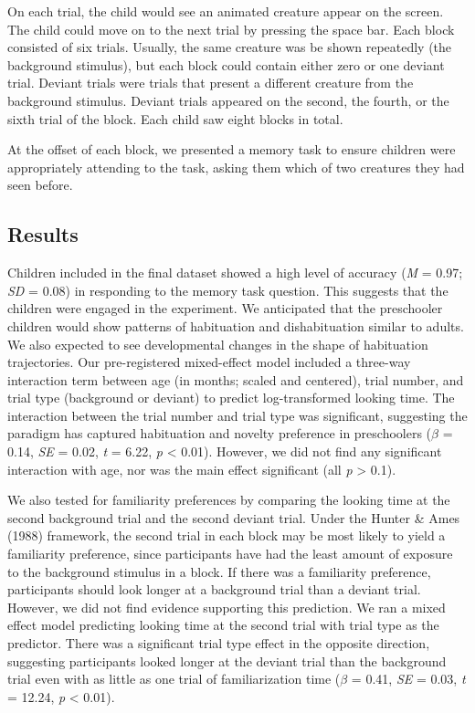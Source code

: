 \documentclass[10pt, letterpaper]{article}
\begin{document}
On each trial, the child would see an animated creature appear on the
screen. The child could move on to the next trial by pressing the space
bar. Each block consisted of six trials. Usually, the same creature was
be shown repeatedly (the background stimulus), but each block could
contain either zero or one deviant trial. Deviant trials were trials
that present a different creature from the background stimulus. Deviant
trials appeared on the second, the fourth, or the sixth trial of the
block. Each child saw eight blocks in total.

At the offset of each block, we presented a memory task to ensure
children were appropriately attending to the task, asking them which of
two creatures they had seen before.

\hypertarget{results}{%
\subsection{Results}\label{results}}

Children included in the final dataset showed a high level of accuracy
(\emph{M} = 0.97; \emph{SD} = 0.08) in responding to the memory task
question. This suggests that the children were engaged in the
experiment. We anticipated that the preschooler children would show
patterns of habituation and dishabituation similar to adults. We also
expected to see developmental changes in the shape of habituation
trajectories. Our pre-registered mixed-effect model included a three-way
interaction term between age (in months; scaled and centered), trial
number, and trial type (background or deviant) to predict
log-transformed looking time. The interaction between the trial number
and trial type was significant, suggesting the paradigm has captured
habituation and novelty preference in preschoolers (\(\beta\) = 0.14,
\emph{SE} = 0.02, \emph{t} = 6.22, \emph{p} \textless{} 0.01). However,
we did not find any significant interaction with age, nor was the main
effect significant (all \emph{p} \textgreater{} 0.1).

We also tested for familiarity preferences by comparing the looking time
at the second background trial and the second deviant trial. Under the
Hunter \& Ames (1988) framework, the second trial in each block may be
most likely to yield a familiarity preference, since participants have
had the least amount of exposure to the background stimulus in a block.
If there was a familiarity preference, participants should look longer
at a background trial than a deviant trial. However, we did not find
evidence supporting this prediction. We ran a mixed effect model
predicting looking time at the second trial with trial type as the
predictor. There was a significant trial type effect in the opposite
direction, suggesting participants looked longer at the deviant trial
than the background trial even with as little as one trial of
familiarization time (\(\beta\) = 0.41, \emph{SE} = 0.03, \emph{t} =
12.24, \emph{p} \textless{} 0.01).
\end{document}

